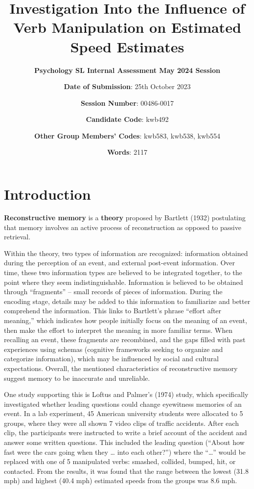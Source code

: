\documentclass[12pt]{article}
\title{\textbf{Investigation Into the Influence of Verb Manipulation on Estimated Speed Estimates}} %
\author{\textbf{Psychology SL Internal Assessment May 2024 Session}\and \textbf{Date of Submission}: 25th October 2023 \and \textbf{Session Number}: 00486-0017\and \textbf{Candidate Code}: kwb492 \and \textbf{Other Group Members' Codes}: kwb583, kwb538, kwb554} %
\date{\textbf{Words}: 2117} %
\begin{document}
\doublespacing

\maketitle %
\thispagestyle{empty}
\pagebreak
\tableofcontents
\thispagestyle{empty}

\clearpage
{}

\pagebreak
\section{Introduction} 
\textbf{Reconstructive memory} is a \textbf{theory} proposed by Bartlett (1932) postulating that memory involves an active process of reconstruction as opposed to passive retrieval. 

Within the theory, two types of information are recognized: information obtained during the perception of an event, and external post-event information. Over time, these two information types are believed to be integrated together, to the point where they seem indistinguishable. Information is believed to be obtained through “fragments” -- small records of pieces of information. During the encoding stage, details may be added to this information to familiarize and better comprehend the information. This links to Bartlett's phrase “effort after meaning,” which indicates how people initially focus on the meaning of an event, then make the effort to interpret the meaning in more familiar terms. When recalling an event, these fragments are recombined, and the gaps filled with past experiences using schemas (cognitive frameworks seeking to organize and categorize information), which may be influenced by social and cultural expectations. Overall, the mentioned characteristics of reconstructive memory suggest memory to be inaccurate and unreliable.  

One study supporting this is Loftus and Palmer's (1974) study, which specifically investigated whether leading questions could change eyewitness memories of an event. In a lab experiment, 45 American university students were allocated to 5 groups, where they were all shown 7 video clips of traffic accidents. After each clip, the participants were instructed to write a brief account of the accident and answer some written questions. This included the leading question (“About how fast were the cars going when they … into each other?”) where the “…” would be replaced with one of 5 manipulated verbs: smashed, collided, bumped, hit, or contacted. From the results, it was found that the range between the lowest (31.8 mph) and highest (40.4 mph) estimated speeds from the groups was 8.6 mph. 
\end{document}
